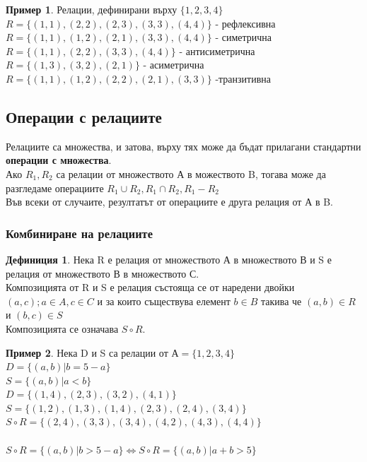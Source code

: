 \documentclass[fleqn, 12pt]{article}
\theoremstyle{definition}
\newtheorem{example}{Пример}[subsection]
\newtheorem{definition}{Дефиниция}[subsection]
\begin{document}
\begin{example}
Релации, дефинирани върху $\{1, 2, 3, 4 \}$ \\
$R = \{ (1, 1), (2, 2), (2, 3), (3, 3), (4, 4) \}$ - рефлексивна \\
$R = \{(1, 1), (1, 2), (2, 1), (3, 3), (4, 4) \}$  - симетрична \\
$R = \{(1, 1), (2, 2), (3, 3), (4, 4) \}$ - антисиметрична \\
$R = \{(1, 3), (3, 2), (2, 1) \}$ - асиметрична \\
$R = \{(1, 1), (1, 2), (2, 2), (2, 1), (3, 3)\}$ -транзитивна\\
\end{example}

\subsection{Операции с релациите}
Релациите са множества, и затова, върху тях може да бъдат прилагани стандартни \textbf{операции с множества}. \\
Ако $R_1, R_2$ са релации от множеството А в можеството B, тогава може да разгледаме операциите $R_1 \cup R_2, R_1 \cap R_2, R_1 - R_2$ \\
Във всеки от случаите, резултатът от операциите е друга релация от А в B. \\

\subsubsection{Комбиниране на релациите}

\begin{definition}
Нека R е релация от множеството А в множеството В и S е релация от множеството В в множеството С. \\
Композицията от R и S е релация състояща се от наредени двойки $(a,c); a \in A, c \in C$ и за които съществува елемент $ b \in B$ такива че $(a, b) \in R$ и $(b,c) \in S$ \\
Композицията се означава $S \circ R$.
\end{definition}

\begin{example}
Нека D и S са релации от $А = \{1, 2, 3, 4 \}$ \\
$D = \{ (a,b) | b = 5-a \}$ \\
$S = \{ (a,b) | a < b\}$\\
$D = \{(1, 4), (2, 3), (3, 2), (4, 1) \}$ \\
$S = \{ (1, 2), (1, 3), (1, 4), (2, 3), (2, 4), (3, 4) \}$\\
$S \circ R = \{ (2, 4), (3, 3), (3, 4), (4, 2), (4, 3), (4, 4) \}$\\
\\
$S \circ R =  \{ (a,b) | b > 5-a \} \Leftrightarrow S \circ R =  \{ (a,b) | a + b > 5 \}$
\end{example}
\end{document}
